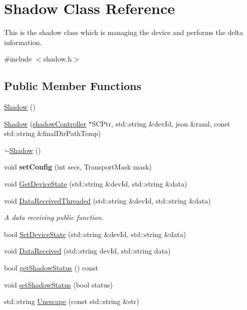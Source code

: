 \hypertarget{classShadow}{}\section{Shadow Class Reference}
\label{classShadow}


This is the shadow class which is managing the device and performs the delta information.  




{\ttfamily \#include $<$shadow.\+h$>$}

\subsection*{Public Member Functions}
\begin{DoxyCompactItemize}
\item 
\hyperlink{classShadow_a9d3360ddba26f0a9ca2d7d7ff52350d1}{Shadow} ()
\item 
\hyperlink{classShadow_aa118e214ce83df6059c49a9b4d05ef9a}{Shadow} (\hyperlink{classshadowController}{shadow\+Controller} $\ast$S\+C\+Ptr, std\+::string \&dev\+Id, json \&raml, const std\+::string \&final\+Dir\+Path\+Temp)
\item 
\hyperlink{classShadow_a6fed128929e13ea3d3de6e64da074b8a}{$\sim$\+Shadow} ()
\item 
void {\bfseries set\+Config} (int secs, Transport\+Mask mask)\hypertarget{classShadow_abd4c538a5a9b3b4ef2cd65fd6a15a07e}{}\label{classShadow_abd4c538a5a9b3b4ef2cd65fd6a15a07e}

\item 
void \hyperlink{classShadow_a2367be22583cb66c8b543ee7e96e3baf}{Get\+Device\+State} (std\+::string \&dev\+Id, std\+::string \&data)
\item 
void \hyperlink{classShadow_a1cf282e040aaf402edce5666d543d75d}{Data\+Received\+Threaded} (std\+::string \&dev\+Id, std\+::string \&data)
\begin{DoxyCompactList}\small\item\em A data receiving public function. \end{DoxyCompactList}\item 
bool \hyperlink{classShadow_a37fef561f7d53ec53ada592e12b2a29f}{Set\+Device\+State} (std\+::string \&dev\+Id, std\+::string \&data)
\item 
void \hyperlink{classShadow_aa4b65dbfa488e71a25093f82d1c197a3}{Data\+Received} (std\+::string dev\+Id, std\+::string data)
\item 
bool \hyperlink{classShadow_a075895088ad94fd4ba48434544cecb4d}{get\+Shadow\+Status} () const 
\item 
void \hyperlink{classShadow_ab45e0f3c046d7de4fe9a11875094c514}{set\+Shadow\+Status} (bool status)
\item 
std\+::string \hyperlink{classShadow_a8761b228129cabf07c324cf4b85ae0b6}{Unescape} (const std\+::string \&str)
\end{DoxyCompactItemize}


